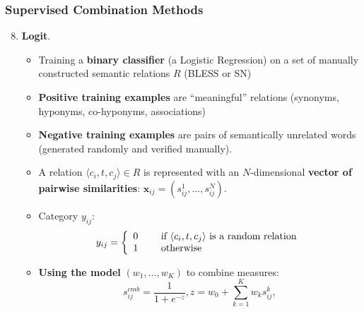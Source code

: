 \documentclass{beamer}
\begin{document}
\begin{frame}
\frametitle{Supervised Combination Methods}

\begin{enumerate}
  \setcounter{enumi}{7}
\item \textbf{Logit}. 

\begin{itemize}
  \item  Training a \textbf{binary classifier} (a Logistic Regression) on a set of manually constructed
semantic relations $R$ (BLESS or SN)

\item \textbf{Positive training examples} are “meaningful” relations (synonyms,
hyponyms, co-hyponyms, associations)
\item \textbf{Negative training examples} are pairs of semantically unrelated words (generated randomly and verified manually).


  \item A relation $\langle c_i,t, c_j \rangle \in R$ is represented with an $N$-dimensional \textbf{vector of pairwise similarities}: $\mathbf{x}_{ij} = (s_{ij}^1,\ldots,s_{ij}^N)$. 

\item Category $y_{ij}$:
$$
y_{ij} = \left\{ 
  \begin{array}{l l}
    0 & \quad  \text{ if } \langle c_i,t, c_j \rangle \text{ is a random relation} 
    \\
    1 & \quad  \text{ otherwise }\\
  \end{array} \right
  .
$$

\item \textbf{Using the model} $(w_1,\ldots,w_K)$ to combine measures: 
$$s^{cmb}_{ij} = \frac{1}{1 + e^{-z}}, z = w_0 + \sum_{k=1}^K w_k s^k_{ij} , $$

\end{itemize}
\end{enumerate}

\end{frame}
\end{document}
